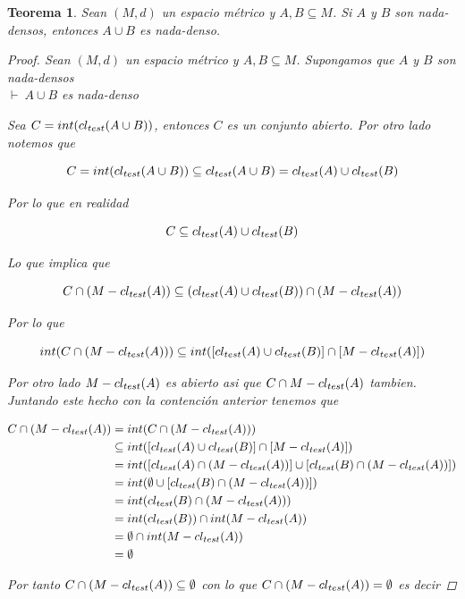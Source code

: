 \documentclass[oneside]{book} %
\theoremstyle{Teorema}
\newtheorem{Teorema}[Definicion]{Teorema}
\theoremstyle{Ejemplos}
\theoremstyle{[Obs]}
\def \test {test}
\newcommand{\cerradura}[2][\test]{\ifx \test #1 {\overline{#2}} \else {cl_{#1}(#2)} \fi} %
\renewcommand{\{}{\left\lbrace} %
\renewcommand{\}}{\right\rbrace} %
\renewcommand{\u}{\cup} %
\newcommand{\n}{\cap} %
\renewcommand{\sc}{\subseteq} %
\newcommand{\pd}{$\vdash\ $} %
\begin{document}
			\begin{Teorema}\setlength{\parindent}{0em}
				
				Sean $(M, d)$ un espacio métrico y $A, B \sc M$. Si $A$ y $B$ son nada-densos, entonces $A \u B$ es nada-denso. 

				\begin{proof}
					
					Sean $(M, d)$ un espacio métrico y $A, B \sc M$. Supongamos que $A$ y $B$ son nada-densos \\ 
					\pd $A \u B$ es nada-denso 

					Sea $C = int(\cerradura{A \u B})$, entonces $C$ es un conjunto abierto. Por otro lado notemos que 

					\[ C = int(\cerradura{A \u B}) \sc \cerradura{A \u B} = \cerradura{A} \u \cerradura{B} \]

					Por lo que en realidad 

					\[ C \sc \cerradura{A} \u \cerradura{B} \]
					
					Lo que implica que 

					\[ C \n (M - \cerradura{A}) \sc (\cerradura{A} \u \cerradura{B}) \n (M - \cerradura{A}) \]

					Por lo que 

					\[ int(C \n (M - \cerradura{A})) \sc int([\cerradura{A} \u \cerradura{B}] \n [M - \cerradura{A}]) \]

					Por otro lado $M - \cerradura{A}$ es abierto asi que $C \n M - \cerradura{A}$ tambien. Juntando este hecho con la contención anterior tenemos que 

					\begin{align*}
						C \n (M - \cerradura{A}) &= int(C \n (M - \cerradura{A})) \\ 
						&\sc int([\cerradura{A} \u \cerradura{B}] \n [M - \cerradura{A}]) \\ 
						&= int([\cerradura{A} \n (M - \cerradura{A})] \u [\cerradura{B} \n (M - \cerradura{A})]) \\ 
						&= int(\emptyset \u [\cerradura{B} \n (M - \cerradura{A})]) \\ 
						&= int(\cerradura{B} \n (M - \cerradura{A})) \\ 
						&= int(\cerradura{B}) \n int(M - \cerradura{A}) \\
						&= \emptyset \n int(M - \cerradura{A}) \\ 
						&= \emptyset 
					\end{align*}

					Por tanto $C \n (M - \cerradura{A}) \sc \emptyset$ con lo que $C \n (M - \cerradura{A}) = \emptyset$ es decir 
					

\end{proof}
\end{Teorema}
\end{document}
